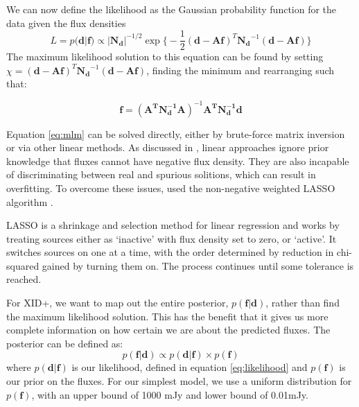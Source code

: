 \documentclass[useAMS,usenatbib]{mnras}
\begin{document}
 We can now define the likelihood as the Gaussian probability function for the data given the flux densities
\begin{equation}
L = p(\mathbf{d}|\mathbf{f}) \propto |\mathbf{N_d}|^{-1/2} \exp\big\{ -\frac{1}{2}(\mathbf{d}-\mathbf{Af})^T\mathbf{N_d}^{-1}(\mathbf{d}-\mathbf{Af})\big\}\label{eq:likelihood}
\end{equation}
The maximum likelihood solution to this equation can be found by setting $\chi = (\mathbf{d}-\mathbf{Af})^T\mathbf{N_d}^{-1}(\mathbf{d}-\mathbf{Af})$, finding the minimum and rearranging such that:

\begin{equation}
\mathbf{f}=(\mathbf{A^TN_d^{-1}A})^{-1}\mathbf{A^TN_d^{-1}d}\label{eq:mlm}
\end{equation}

Equation \ref{eq:mlm} can be solved directly, either by brute-force matrix inversion or via other linear methods. As discussed in \cite{Roseboom:2010, Roseboom:2011, Wang:2014}, linear approaches ignore prior knowledge that fluxes cannot have negative flux density.  They are also incapable of discriminating between real and spurious solitions, which can result in overfitting. To overcome these issues, \cite{Roseboom:2011} used the non-negative weighted LASSO algorithm \citep{Tibshirani:1996, Zou:2006, terBraak:2010}.

LASSO is a shrinkage and selection method for linear regression and works by treating sources either as `inactive' with flux density set to zero, or `active'. It switches sources on one at a time, with the order determined by reduction in chi-squared gained by turning them on. The process continues until some tolerance is reached.

%

For \textsc{XID+}, we want to map out the entire posterior, $p(\mathbf{f}|\mathbf{d})$, rather than find the maximum likelihood solution. This has the benefit that it gives us more complete information on how certain we are about the predicted fluxes. The posterior can be defined as:
\begin{equation}
p(\mathbf{f}|\mathbf{d}) \propto p(\mathbf{d}|\mathbf{f}) \times p(\mathbf{f})
\end{equation}
where $p(\mathbf{d}|\mathbf{f})$ is our likelihood, defined in equation \ref{eq:likelihood} and $p(\mathbf{f})$ is our prior on the fluxes. For our simplest model, we use a uniform distribution for $p(\mathbf{f})$, with an upper bound of 1000 mJy and lower bound of 0.01mJy.
\end{document}
